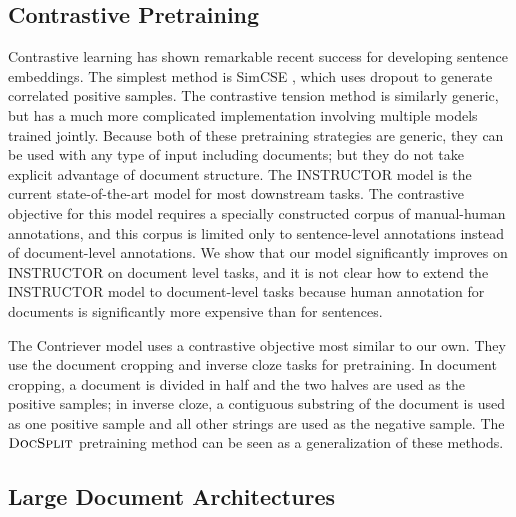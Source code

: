 \documentclass[11pt]{article}
\newcommand{\our}{\mbox{\textsc{DocSplit}}}
\begin{document}
\subsection{Contrastive Pretraining}
\label{sec:contrastive}

Contrastive learning has shown remarkable recent success for developing sentence embeddings.
The simplest method is SimCSE \cite{Gao2021SimCSESC},
which uses dropout to generate correlated positive samples.
The contrastive tension method \cite{Carlsson2021SemanticRW} is similarly generic,
but has a much more complicated implementation involving multiple models trained jointly.
Because both of these pretraining strategies are generic,
they can be used with any type of input including documents;
but they do not take explicit advantage of document structure.
The INSTRUCTOR model \cite{Su2022OneEA} is the current state-of-the-art model for most downstream tasks.
The contrastive objective for this model requires a specially constructed corpus of manual-human annotations,
and this corpus is limited only to sentence-level annotations instead of document-level annotations.
We show that our model significantly improves on INSTRUCTOR on document level tasks, and it is not clear how to extend the INSTRUCTOR model to document-level tasks because human annotation for documents is significantly more expensive than for sentences.

The Contriever model \cite{Izacard2021UnsupervisedDI} uses a contrastive objective most similar to our own.
They use the document cropping and inverse cloze tasks for pretraining.
In document cropping, a document is divided in half and the two halves are used as the positive samples;
in inverse cloze, a contiguous substring of the document is used as one positive sample and all other strings are used as the negative sample.
The $\our$ pretraining method can be seen as a generalization of these methods.

\subsection{Large Document Architectures}

\end{document}
